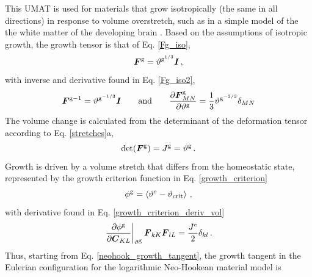 \documentclass[10pt,letterpaper,oneside]{report}
\newcommand{\ten}[1]{\mbox{\boldmath $#1$}{}}
\newcommand{\scas}[1]{\mbox{{\scriptsize{${\rm{#1}}$}}}{}}
\begin{document}
This UMAT is used for materials that grow isotropically (the same in all directions) in response to volume overstretch, such as in a simple model of the the white matter of the developing brain \cite{Holland2015}.  Based on the assumptions of isotropic growth, the growth tensor is that of Eq. \ref{Fg_iso},
\begin{equation*}
\ten{F}^{\scas{g}} = \vartheta^{\scas{g}^{1/3}} \ten{I} \, , 
\end{equation*}
with inverse and derivative found in Eq. \ref{Fg_iso2},
\begin{equation*}
\ten{F}^{\scas{g}-1} = \vartheta^{\scas{g}^{-1/3}} \ten{I}
\qquad \mbox{and} \qquad
\frac{\partial \ten{F}^{\scas{g}}_{MN} }{\partial \vartheta^{\scas{g}}} = \frac{1}{3} \vartheta^{\scas{g}^{-2/3}} \delta_{MN}
\end{equation*}
The volume change is calculated from the determinant of the deformation tensor according to Eq. \ref{stretches}a,
\begin{equation*}
\det (\ten{F}^{\scas{g}}) = J^{\scas{g}} = \vartheta^{\scas{g}} \, . 
\end{equation*}
Growth is driven by a volume stretch that differs from the homeostatic state, represented by the growth criterion function in Eq. \ref{growth_criterion}
\begin{equation*}
\phi^{\scas{g}} = \left\langle \vartheta^{\scas{e}} - \vartheta_{\scas{crit}} \right\rangle \, ,
\end{equation*}
with derivative found in Eq. \ref{growth_criterion_deriv_vol}
\begin{equation*}
\left. \frac{\partial \phi^{\scas{g}} }{\partial \ten{C}_{KL}} \right|_{\vartheta^{\scas{g}}} \ten{F}_{kK} \ten{F}_{lL} 
= \frac{J^{\scas{e}}}{2} \delta_{kl} \, . 
\end{equation*}
Thus, starting from Eq. \ref{neohook_growth_tangent}, the growth tangent in the Eulerian configuration for the logarithmic Neo-Hookean material model is
\end{document}
